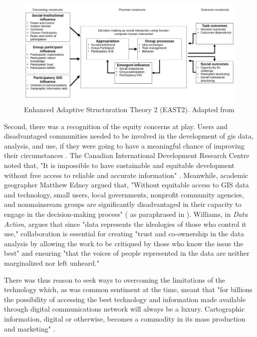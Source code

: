 \begin{figure}[h]
	\centering
	\includegraphics[scale=0.4]{Figures/chap2/east2.jpg}
	\caption[Enhanced Adaptive Structuration Theory 2]{Enhanced Adaptive Structuration Theory 2 (EAST2). Adapted from \cite{jankowskiGISGroupDecision2001}}
	\label{fig:east2}
\end{figure}

Second, there was a recognition of the equity concerns at play. Users and disadvantaged communities needed to be involved in the development of \ac{gis} data, analysis, and use, if they were going to have a meaningful chance of improving their circumstances \cite{talenBottomUpGIS2000}. The Canadian International Development Research Centre noted that, "It is impossible to have sustainable and equitable development without free access to reliable and accurate information" \cite{benmouffokInformationDecisionMaking1993}. Meanwhile, academic geographer Matthew Edney argued that, "Without equitable access to GIS data and technology, small users, local governments, nonprofit community agencies, and nonmainsream groups are significantly disadvantaged in their capacity to engage in the decision-making process" (\cite{edney1991strategies} as paraphrased in \cite{harrisPursuingSocialGoals1994}). Williams, in \textit{Data Action}, argues that since "data represents the ideologies of those who control it use," collaboration is essential for creating "trust and co-ownership in the data analysis by allowing the work to be critiqued by those who know the issue the best" and ensuring "that the voices of people represented in the data are neither marginalized nor left unheard."

There was thus reason to seek ways to overcoming the limitations of the technology which, as was common sentiment at the time, meant that "for billions the possibility of accessing the best technology and information made available through digital communications network will always be a luxury. Cartographic information, digital or otherwise, becomes a commodity in its mass production and marketing" \cite{mchaffieManufacturingMetaphors1994}. 

